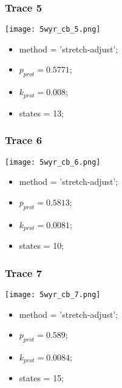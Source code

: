 \subsubsection{Trace 5}
\begin{minipage}[c]{0.7\textwidth}
    \texttt{[image: 5wyr\_cb\_5.png]}
\end{minipage}
\hfill
\begin{minipage}[c]{0.45\textwidth}
    \begin{itemize}
        \item method = 'stretch-adjust';
        \item $p_{prot}=0.5771$;
        \item $k_{prot}=0.008$;
        \item states = 13;
    \end{itemize}
\end{minipage}

\subsubsection{Trace 6}
\begin{minipage}[c]{0.7\textwidth}
    \texttt{[image: 5wyr\_cb\_6.png]}
\end{minipage}
\hfill
\begin{minipage}[c]{0.45\textwidth}
    \begin{itemize}
        \item method = 'stretch-adjust';
        \item $p_{prot}=0.5813$;
        \item $k_{prot}=0.0081$;
        \item states = 10;
    \end{itemize}
\end{minipage}

\subsubsection{Trace 7}
\begin{minipage}[c]{0.7\textwidth}
    \texttt{[image: 5wyr\_cb\_7.png]}
\end{minipage}
\hfill
\begin{minipage}[c]{0.45\textwidth}
    \begin{itemize}
        \item method = 'stretch-adjust';
        \item $p_{prot}=0.589$;
        \item $k_{prot}=0.0084$;
        \item states = 15;
    \end{itemize}
\end{minipage}

